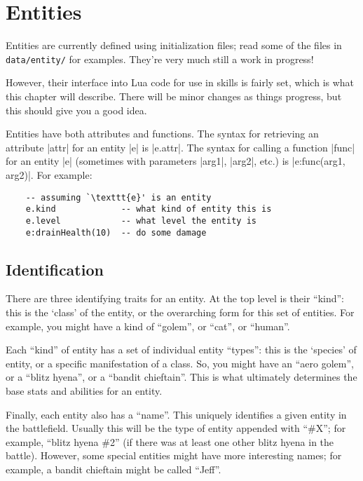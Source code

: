 \chapter{Entities}
\label{ch:entities}

Entities are currently defined using initialization files;
read some of the files in \texttt{data/entity/} for examples.
They're very much still a work in progress!

However, their interface into Lua code for use in skills is fairly set,
which is what this chapter will describe.
There will be minor changes as things progress,
but this should give you a good idea.

Entities have both attributes and functions.
The syntax for retrieving an attribute |attr| for an entity |e| is |e.attr|.
The syntax for calling a function |func| for an entity |e|
(sometimes with parameters |arg1|, |arg2|, etc.) is |e:func(arg1, arg2)|.
For example:

\begin{lstlisting}
    -- assuming `\texttt{e}' is an entity
    e.kind             -- what kind of entity this is
    e.level            -- what level the entity is
    e:drainHealth(10)  -- do some damage
\end{lstlisting}

\section{Identification}
\label{sec:entity_ident}

There are three identifying traits for an entity.
At the top level is their ``kind'': this is the `class' of the entity,
or the overarching form for this set of entities.
For example, you might have a kind of ``golem'', or ``cat'', or ``human''.

Each ``kind'' of entity has a set of individual entity ``types'':
this is the `species' of entity, or a specific manifestation of a class.
So, you might have an ``aero golem'', or a ``blitz hyena'', or a ``bandit chieftain''.
This is what ultimately determines the base stats and abilities for an entity.

Finally, each entity also has a ``name''.
This uniquely identifies a given entity in the battlefield.
Usually this will be the type of entity appended with ``\#X'';
for example, ``blitz hyena \#2''
(if there was at least one other blitz hyena in the battle).
However, some special entities might have more interesting names;
for example, a bandit chieftain might be called ``Jeff''.

